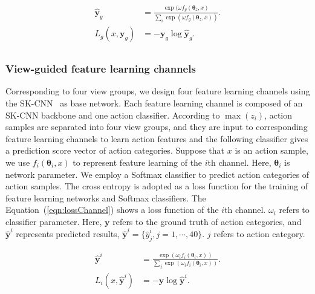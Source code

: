 \documentclass[journal]{IEEEtran}
\begin{document}
\begin{equation}
\begin{aligned}
\hat{\textbf{y}}_g & = \frac{\exp( \omega f_g(\bm{\theta}_z, x) } {\sum_i \exp( \omega f_g(\bm{\theta}_z, x) ) }. \\
L_g( x,\textbf{y}_g ) & = -\textbf{y}_g \log \hat{\textbf{y}}_g. \\
\label{eqn:lossGroup}
\end{aligned}
\end{equation}

\subsubsection{View-guided feature learning channels}
Corresponding to four view groups, we design four feature learning channels using the SK-CNN~\cite{EnhancedSK2017} as base network. Each feature learning channel is composed of an SK-CNN backbone and one action classifier.
According to $\max(z_i)$, action samples are separated into four view groups, and they are input to corresponding feature learning channels to learn action features and the following classifier gives a prediction score vector of action categories. Suppose that $x$ is an action sample, we use $f_i( \bm{\theta}_i, x)$ to represent feature learning of the $i$th channel. Here, $\bm{\theta}_i$ is network parameter.
We employ a Softmax classifier to predict action categories of action samples. The cross entropy is adopted as a loss function for the training of feature learning networks and Softmax classifiers. The Equation~(\ref{eqn:lossChannel}) shows a loss function of the $i$th channel. $\omega_i$ refers to classifier parameter. Here, $\textbf{y}$ refers to the ground truth of action categories, and $\hat{\textbf{y}}^i$ represents predicted results, $\hat{\textbf{y}}^i = \{ \hat{y}^i_j, j=1, \cdots, 40 \}$. $j$ refers to action category.

\begin{equation}
\begin{aligned}
\hat{\textbf{y}}^i & = \frac{\exp( \omega_i f_i( \bm{\theta}_i, x) ) } {\sum_j \exp( \omega_i f_i( \bm{\theta}_i, x) ) }. \\
L_i(x,\hat{\textbf{y}}^i) & = -\textbf{y} \log \hat{\textbf{y}}^i. \\
\label{eqn:lossChannel}
\end{aligned}
\end{equation}
\end{document}
